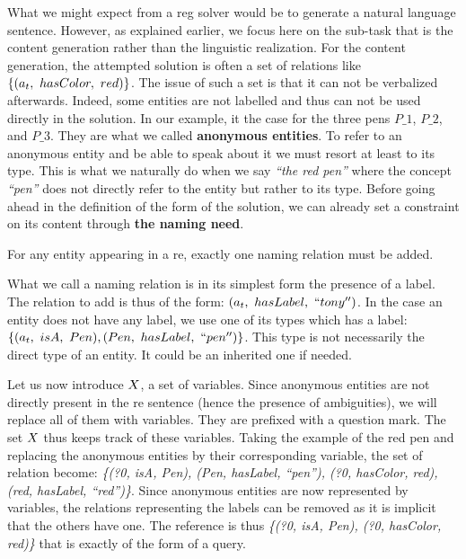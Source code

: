 What we might expect from a \acrshort{reg} solver would be to generate a natural language sentence. However, as explained earlier, we focus here on the sub-task that is the content generation rather than the linguistic realization. For the content generation, the attempted solution is often a set of relations like $\{ (a_t,\ hasColor,\ red)\}$. The issue of such a set is that it can not be verbalized afterwards. Indeed, some entities are not labelled and thus can not be used directly in the solution. In our example, it the case for the three pens $P\_1$, $P\_2$, and $P\_3$. They are what we called \textbf{anonymous entities}. To refer to an anonymous entity and be able to speak about it we must resort at least to its type. This is what we naturally do when we say \textit{``the red pen''} where the concept \textit{``pen''} does not directly refer to the entity but rather to its type. Before going ahead in the definition of the form of the solution, we can already set a constraint on its content through \textbf{the naming need}.

\begin{theorem} 
\label{the:parlance_need}
For any entity appearing in a \acrshort{re}, exactly one naming relation must be added.
\end{theorem}

What we call a naming relation is in its simplest form the presence of a label. The relation to add is thus of the form: $(a_t,\ hasLabel,\ ``tony'')$. In the case an entity does not have any label, we use one of its types which has a label: $\{(\indiv_t,\ isA,\ Pen), (Pen,\ hasLabel,\ ``pen'')\}$. This type is not necessarily the direct type of an entity. It could be an inherited one if needed.

Let us now introduce $X$, a set of variables. Since anonymous entities are not directly present in the \acrshort{re} sentence (hence the presence of ambiguities), we will replace all of them with variables. They are prefixed with a question mark. The set $X$ thus keeps track of these variables. Taking the example of the red pen and replacing the anonymous entities by their corresponding variable, the set of relation become: \textit{\{(?0, isA, Pen), (Pen, hasLabel, ``pen''), (?0, hasColor, red), (red,  hasLabel, ``red'')\}}. Since anonymous entities are now represented by variables, the relations representing the labels can be removed as it is implicit that the others have one. The reference is thus \textit{\{(?0, isA, Pen), (?0, hasColor, red)\}} that is exactly of the form of a \sparql{} query.

